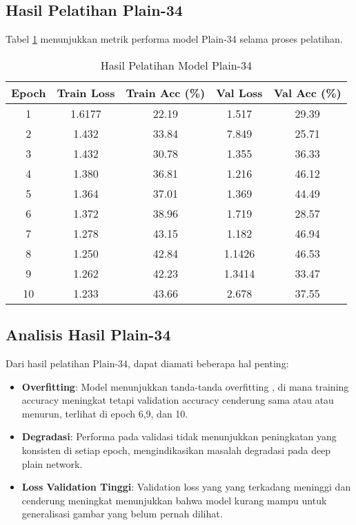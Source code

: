 \documentclass[11pt,a4paper]{article}
\begin{document}
\subsection{Hasil Pelatihan Plain-34}

Tabel \ref{tab:plain34-results} menunjukkan metrik performa model Plain-34 selama proses pelatihan.

\begin{table}[H]
\centering
\caption{Hasil Pelatihan Model Plain-34}
\label{tab:plain34-results}
\begin{tabular}{ccccc}
\toprule
\textbf{Epoch} & \textbf{Train Loss} & \textbf{Train Acc (\%)} & \textbf{Val Loss} & \textbf{Val Acc (\%)} \\
\midrule
1 & 1.6177 & 22.19 & 1.517 & 29.39 \\
2 & 1.432 & 33.84 & 7.849 & 25.71 \\
3 & 1.432 & 30.78 & 1.355 & 36.33 \\
4 & 1.380 & 36.81 &  1.216 & 46.12 \\
5 & 1.364 & 37.01 & 1.369 & 44.49 \\
6 & 1.372 & 38.96 & 1.719 & 28.57 \\
7 & 1.278 & 43.15 & 1.182 & 46.94 \\
8 & 1.250 & 42.84 &  1.1426 & 46.53 \\
9 & 1.262 & 42.23 &  1.3414 & 33.47 \\
10 & 1.233 & 43.66 & 2.678  &  37.55 \\

\bottomrule
\end{tabular}
\end{table}

\subsection{Analisis Hasil Plain-34}

Dari hasil pelatihan Plain-34, dapat diamati beberapa hal penting:

\begin{itemize}
    \item \textbf{Overfitting}: Model menunjukkan tanda-tanda overfitting , di mana training accuracy meningkat tetapi validation accuracy cenderung sama atau atau menurun, terlihat di epoch 6,9, dan 10.
    
    \item \textbf{Degradasi}: Performa pada validasi tidak menunjukkan peningkatan yang konsisten di setiap epoch, mengindikasikan masalah degradasi pada deep plain network.
    
    \item \textbf{Loss Validation Tinggi}: Validation loss yang yang terkadang meninggi dan cenderung meningkat menunjukkan bahwa model kurang mampu untuk generalisasi gambar yang belum pernah dilihat.
\end{itemize}
\end{document}
